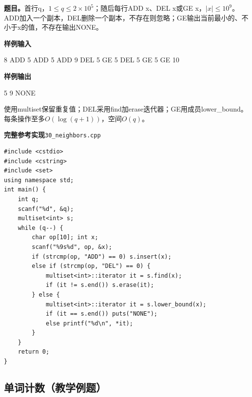 \documentclass[UTF8,11pt,a4paper,fontset=none]{ctexart}
\begin{document}
\noindent\textbf{题目。}首行q，$1\le q\le2\times10^5$；随后每行ADD x、DEL x或GE x，$|x|\le10^9$。ADD加入一个副本，DEL删除一个副本，不存在则忽略；GE输出当前最小的、不小于x的值，不存在输出NONE。
\begin{tcolorbox}[samplebox,title={输入输出样例}]
\textbf{样例输入}
\begin{Sample}
8
ADD 5
ADD 5
ADD 9
DEL 5
GE 5
DEL 5
GE 5
GE 10
\end{Sample}
\tcblower
\textbf{样例输出}
\begin{Sample}
5
9
NONE
\end{Sample}
\end{tcolorbox}
使用multiset保留重复值；DEL采用find加erase迭代器；GE用成员lower\_bound。每条操作至多$O(\log(q+1))$，空间$O(q)$。
\par\noindent\begin{minipage}{\linewidth}
\textbf{完整参考实现}\quad\texttt{30\_neighbors.cpp}
\begin{lstlisting}
#include <cstdio>
#include <cstring>
#include <set>
using namespace std;
int main() {
    int q;
    scanf("%d", &q);
    multiset<int> s;
    while (q--) {
        char op[10]; int x;
        scanf("%9s%d", op, &x);
        if (strcmp(op, "ADD") == 0) s.insert(x);
        else if (strcmp(op, "DEL") == 0) {
            multiset<int>::iterator it = s.find(x);
            if (it != s.end()) s.erase(it);
        } else {
            multiset<int>::iterator it = s.lower_bound(x);
            if (it == s.end()) puts("NONE");
            else printf("%d\n", *it);
        }
    }
    return 0;
}
\end{lstlisting}
\end{minipage}\par

\subsection{单词计数（教学例题）}
\end{document}
